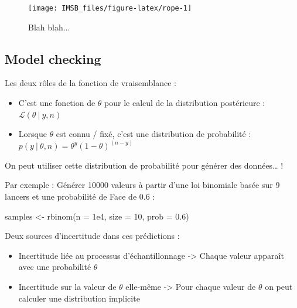 \documentclass[
  a4paper,11pt,twoside,onecolumn,openright,final,oldfontcommands]{memoir}
\newenvironment{Shaded}{\begin{snugshade}}{\end{snugshade}}
\newcommand{\AttributeTok}[1]{\textcolor[rgb]{0.77,0.63,0.00}{#1}}
\newcommand{\DecValTok}[1]{\textcolor[rgb]{0.00,0.00,0.81}{#1}}
\newcommand{\FloatTok}[1]{\textcolor[rgb]{0.00,0.00,0.81}{#1}}
\newcommand{\FunctionTok}[1]{\textcolor[rgb]{0.00,0.00,0.00}{#1}}
\newcommand{\NormalTok}[1]{#1}
\newcommand{\OtherTok}[1]{\textcolor[rgb]{0.56,0.35,0.01}{#1}}
\providecommand{\tightlist}{%
  \setlength{\itemsep}{0pt}\setlength{\parskip}{0pt}}
\theoremstyle{definition}
\theoremstyle{definition}
\theoremstyle{definition}
\theoremstyle{definition}
\theoremstyle{remark}
\begin{document}
\begin{figure}[!htb]

{\centering \texttt{[image: IMSB\_files/figure-latex/rope-1]} 

}

\caption{Blah blah...}\label{fig:rope}
\end{figure}

\hypertarget{model-checking}{%
\subsection{Model checking}\label{model-checking}}

Les deux rôles de la fonction de vraisemblance :

\begin{itemize}
\tightlist
\item
  C'est une fonction de \(\theta\) pour le calcul de la distribution postérieure : \(\mathcal{L}(\theta \ | \ y, n)\)
\item
  Lorsque \(\theta\) est connu / fixé, c'est une distribution de probabilité : \(p(y \ |\ \theta, n) = \theta^y(1 - \theta)^{(n - y)}\)
\end{itemize}

On peut utiliser cette distribution de probabilité pour générer des données\ldots{} !

Par exemple : Générer 10000 valeurs à partir d'une loi binomiale basée sur 9 lancers et une probabilité de Face de 0.6 :

\begin{Shaded}
\begin{Highlighting}[]
\NormalTok{samples }\OtherTok{\textless{}{-}} \FunctionTok{rbinom}\NormalTok{(}\AttributeTok{n =} \FloatTok{1e4}\NormalTok{, }\AttributeTok{size =} \DecValTok{10}\NormalTok{, }\AttributeTok{prob =} \FloatTok{0.6}\NormalTok{)}
\end{Highlighting}
\end{Shaded}

Deux sources d'incertitude dans ces prédictions :

\begin{itemize}
\tightlist
\item
  Incertitude liée au processus d'échantillonnage
  -\textgreater{} Chaque valeur apparaît avec une probabilité \(\theta\)
\item
  Incertitude sur la valeur de \(\theta\) elle-même
  -\textgreater{} Pour chaque valeur de \(\theta\) on peut calculer une distribution implicite
\end{itemize}
\end{document}
